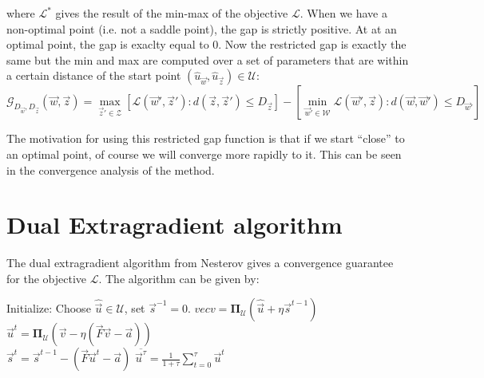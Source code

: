 where $\mathcal{L}^*$ gives the result of the min-max of the objective
$\mathcal{L}$. When we have a non-optimal point (i.e. not a saddle point), the
gap is strictly positive. At at an optimal point, the gap is exaclty equal to 0.
Now the restricted gap is exactly the same but the min and max are computed over
a set of parameters that are within a certain distance of the start point
$(\hat{u}_{\vec w},\hat{u}_{\vec z}) \in \mathcal{U}$:
\begin{equation}
  \mathcal{G}_{D_{\vec w}, D_{\vec z}}(\vec w, \vec z) = \max_{\vec z' \in
\mathcal{Z}} \left[ \mathcal{L}(\vec w', \vec z') : d(\vec z, \vec z') \leq
D_{\vec z} \right] - \left [ \min_{\vec w' \in \mathcal{W}} \mathcal{L}(\vec w',
\vec z) : d(\vec w, \vec w') \leq D_{\vec w'} \right ]
\end{equation}

The motivation for using this restricted gap function is that if we start ``close'' to an optimal point, of course we will converge more rapidly to it. This can be seen in the convergence analysis of the method. 


\section{Dual Extragradient algorithm}

The dual extragradient algorithm from Nesterov gives a convergence guarantee for the objective $\mathcal{L}$. The algorithm can be given by:

\begin{algorithmic}
  \STATE Initialize: Choose $\hat{\vec u} \in \mathcal{U}$, set $\vec s^{-1} = 0$.
  \STATE $vec v = \mathbf{\Pi}_{\mathcal{U}}(\hat{\vec u} + \eta \vec s^{t-1})$\\
  \STATE $\vec u^t = \mathbf{\Pi}_{\mathcal{U}}(\vec v - \eta (\vec F \vec v - \vec a))$\\
  \STATE $\vec s^t =  \vec s^{t-1} - (\vec F \vec u^t - \vec a)$
  \ENDFOR
  \RETURN $\overline{\vec u^{\tau}} = \frac{1}{1 + \tau} \sum_{t=0}^{\tau} \vec u^t$
\end{algorithmic}


